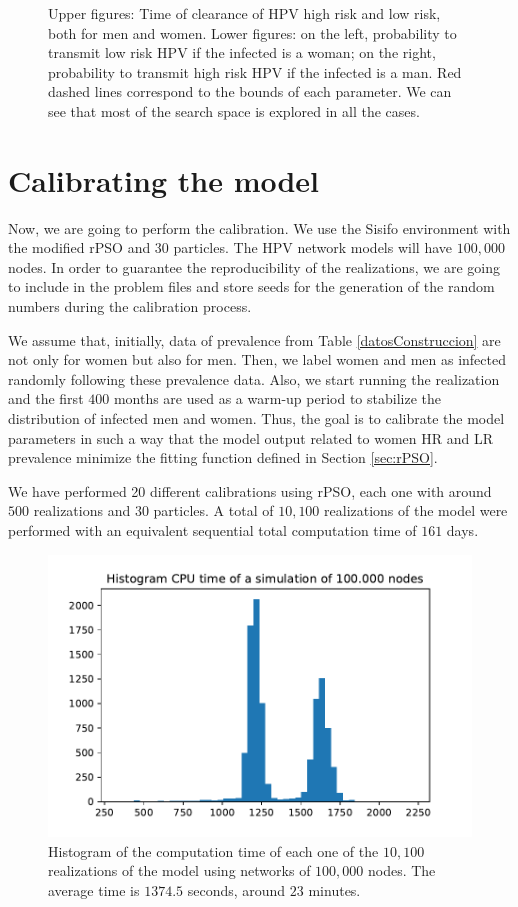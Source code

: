 \begin{figure}[!h]
\begin{center}
\begin{tabular}{cc}
\end{tabular}
\caption{Upper figures: Time of clearance of HPV high risk and low risk, both for men and women. Lower figures: on the left, probability to transmit low risk HPV if the infected is a woman; on the right, probability to transmit high risk HPV if the infected is a man. Red dashed lines correspond to the bounds of each parameter. We can see that most of the search space is explored in all the cases.} 
\label{Ctg}
\end{center}
\end{figure}

\section{Calibrating the model}
Now, we are going to perform the calibration. We use the Sisifo environment with the modified rPSO and 30 particles. The HPV network models will have $100,000$ nodes. In order to guarantee the reproducibility of the realizations, we are going to include in the problem files and store seeds for the generation of the random numbers during the calibration process.

We assume that, initially, data of prevalence from Table \ref{datosConstruccion} are not only for women but also for men. Then, we label women and men as infected randomly following these prevalence data. Also, we start running the realization and the first $400$ months are used as a warm-up period to stabilize the distribution of infected men and women. Thus, the goal is to calibrate the model parameters in such a way that the model output related to women HR and LR prevalence minimize the fitting function defined in Section \ref{sec:rPSO}.

We have performed 20 different calibrations using rPSO, each one with around $500$ realizations and $30$ particles. A total of $10,100$ realizations of the model were performed with an equivalent sequential total computation time of $161$ days.

\begin{figure}[h!]
	\centering
	\includegraphics[width=0.6\linewidth]{IMGs/1.-Calibrado/Hist_CPU_time.pdf}
	\caption{Histogram of the computation time of each one of the $10,100$ realizations of the model using networks of $100,000$ nodes. The average time is $1374.5$ seconds, around $23$ minutes.}
\end{figure}

